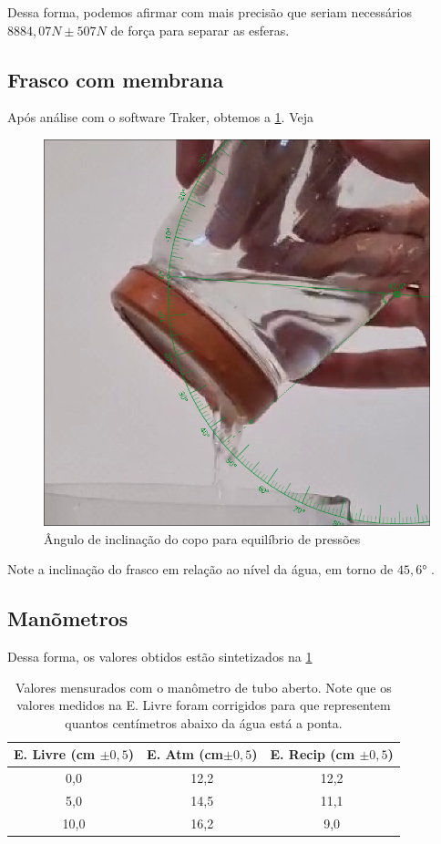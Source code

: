     Dessa forma, podemos afirmar com mais precisão que seriam necessários \(8884,07 N \pm 507 N\) de força para separar as esferas. 

\subsection{Frasco com membrana}

    Após análise com o software Traker, obtemos a \cref{copo.png}. Veja
    \begin{figure}[H]
        \centering
        \includegraphics[width=.5\linewidth]{fig/copo.png}
        \caption{Ângulo de inclinação do copo para equilíbrio de pressões}
        \label{copo.png}
    \end{figure}

    Note a inclinação do frasco em relação ao nível da água, em torno de \( 45,6 \)° .

\subsection{Manõmetros}



Dessa forma, os valores obtidos estão sintetizados na \cref{tab_man}

\begin{table}[H]
    \centering
    \begin{tabular}{c | c | c}
        \hline
        \textbf{E. Livre (cm \(\pm 0,5\))} & \textbf{E. Atm (cm\(\pm 0,5\))} & \textbf{E. Recip (cm \(\pm0,5\))}\\
        \hline
        0,0 & 12,2 & 12,2\\
        \hline
        5,0 & 14,5 & 11,1\\
        \hline
        10,0 & 16,2 & 9,0\\
        \hline
    \end{tabular}
    \caption{Valores mensurados com o manômetro de tubo aberto. Note que os valores medidos na E. Livre foram corrigidos para que representem quantos centímetros abaixo da água está a ponta.}
    \label{tab_man}
\end{table}

